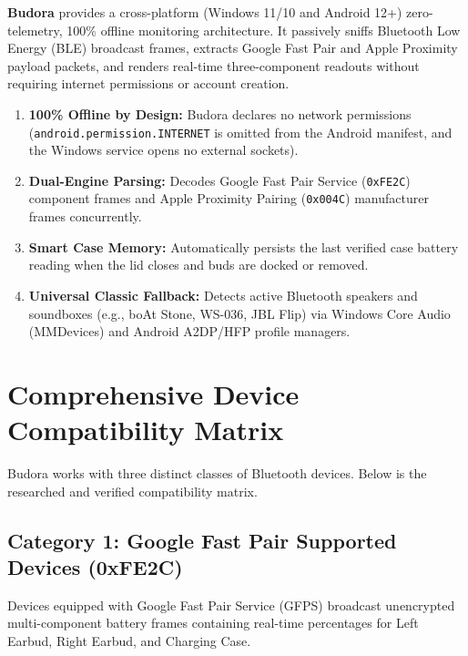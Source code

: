 \documentclass[11pt,a4paper]{article}
\begin{document}
\textbf{Budora} provides a cross-platform (Windows 11/10 and Android 12+) zero-telemetry, 100\% offline monitoring architecture. It passively sniffs Bluetooth Low Energy (BLE) broadcast frames, extracts Google Fast Pair and Apple Proximity payload packets, and renders real-time three-component readouts without requiring internet permissions or account creation.

\begin{infobox}
\begin{enumerate}
    \item \textbf{100\% Offline by Design:} Budora declares no network permissions (\texttt{android.permission.INTERNET} is omitted from the Android manifest, and the Windows service opens no external sockets).
    \item \textbf{Dual-Engine Parsing:} Decodes Google Fast Pair Service (\texttt{0xFE2C}) component frames and Apple Proximity Pairing (\texttt{0x004C}) manufacturer frames concurrently.
    \item \textbf{Smart Case Memory:} Automatically persists the last verified case battery reading when the lid closes and buds are docked or removed.
    \item \textbf{Universal Classic Fallback:} Detects active Bluetooth speakers and soundboxes (e.g., boAt Stone, WS-036, JBL Flip) via Windows Core Audio (MMDevices) and Android A2DP/HFP profile managers.
\end{enumerate}
\end{infobox}

\section{Comprehensive Device Compatibility Matrix}

Budora works with three distinct classes of Bluetooth devices. Below is the researched and verified compatibility matrix.

\subsection{Category 1: Google Fast Pair Supported Devices (0xFE2C)}
Devices equipped with Google Fast Pair Service (GFPS) broadcast unencrypted multi-component battery frames containing real-time percentages for Left Earbud, Right Earbud, and Charging Case.
\end{document}

